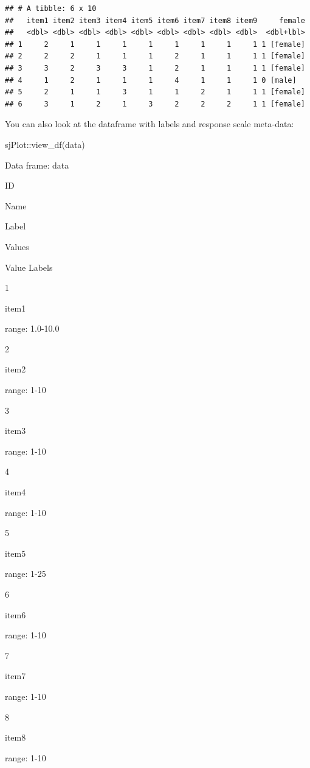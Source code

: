 \documentclass[
]{article}
\newenvironment{Shaded}{\begin{snugshade}}{\end{snugshade}}
\newcommand{\FunctionTok}[1]{\textcolor[rgb]{0.00,0.00,0.00}{#1}}
\newcommand{\NormalTok}[1]{#1}
\newcommand{\SpecialCharTok}[1]{\textcolor[rgb]{0.00,0.00,0.00}{#1}}
\begin{document}
\begin{verbatim}
## # A tibble: 6 x 10
##   item1 item2 item3 item4 item5 item6 item7 item8 item9     female
##   <dbl> <dbl> <dbl> <dbl> <dbl> <dbl> <dbl> <dbl> <dbl>  <dbl+lbl>
## 1     2     1     1     1     1     1     1     1     1 1 [female]
## 2     2     2     1     1     1     2     1     1     1 1 [female]
## 3     3     2     3     3     1     2     1     1     1 1 [female]
## 4     1     2     1     1     1     4     1     1     1 0 [male]  
## 5     2     1     1     3     1     1     2     1     1 1 [female]
## 6     3     1     2     1     3     2     2     2     1 1 [female]
\end{verbatim}

You can also look at the dataframe with labels and response scale
meta-data:

\begin{Shaded}
\begin{Highlighting}[]
\NormalTok{sjPlot}\SpecialCharTok{::}\FunctionTok{view\_df}\NormalTok{(data)}
\end{Highlighting}
\end{Shaded}

Data frame: data

ID

Name

Label

Values

Value Labels

1

item1

range: 1.0-10.0

2

item2

range: 1-10

3

item3

range: 1-10

4

item4

range: 1-10

5

item5

range: 1-25

6

item6

range: 1-10

7

item7

range: 1-10

8

item8

range: 1-10
\end{document}
